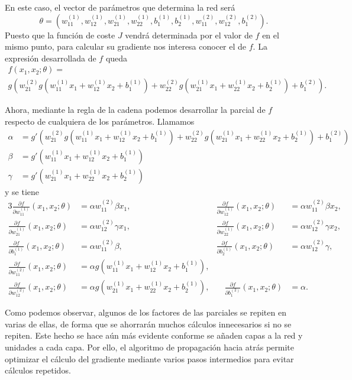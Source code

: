 \begin{example}
En este caso, el vector de parámetros que determina la red será
$$\theta=\left(w_{11}^{(1)},w_{12}^{(1)},w_{21}^{(1)},w_{22}^{(1)},b_{1}^{(1)},b_{2}^{(1)},w_{11}^{(2)},w_{12}^{(2)},b_{1}^{(2)}\right).$$
Puesto que la función de coste $J$ vendrá determinada por el valor de $f$ en el mismo punto, para calcular su gradiente nos interesa conocer el de $f$. La expresión desarrollada de $f$ queda
\begin{gather*}
f(x_1,x_2;\theta)=\\g\left(w_{21}^{(2)}g\left(w_{11}^{(1)}x_{1}+w_{12}^{(1)}x_2+b_1^{(1)}\right)+w_{22}^{(2)}g\left(w_{21}^{(1)}x_1+w_{22}^{(1)}x_2+b_2^{(1)}\right)+b_1^{(2)}\right).
\end{gather*}

Ahora, mediante la regla de la cadena podemos desarrollar la parcial de $f$ respecto de cualquiera de los parámetros. Llamamos
\footnotesize
\begin{align*}
  \alpha&=g'\left(w_{21}^{(2)} g\left(w_{11}^{(1)}x_{1}+w_{12}^{(1)}x_2+b_1^{(1)}\right) + w_{22}^{(2)} g\left(w_{21}^{(1)}x_1+w_{22}^{(1)}x_2+b_2^{(1)}\right)+b_1^{(2)}\right)\\
  \beta&=g'\left(w_{11}^{(1)}x_{1}+w_{12}^{(1)}x_2+b_1^{(1)}\right)\\
  \gamma&=g'\left(w_{21}^{(1)}x_{1}+w_{22}^{(1)}x_2+b_2^{(1)}\right)
\end{align*}
\normalsize
y se tiene
\footnotesize
\begin{alignat*}{3}
  \frac{\partial f}{\partial w_{11}^{(1)}}(x_1,x_2;\theta)&=\alpha w_{11}^{(2)}\beta x_1,\quad&
  \frac{\partial f}{\partial w_{12}^{(1)}}(x_1,x_2;\theta)&=\alpha w_{11}^{(2)}\beta x_2,\\
  \frac{\partial f}{\partial w_{21}^{(1)}}(x_1,x_2;\theta)&=\alpha w_{12}^{(2)}\gamma x_1,\quad&
  \frac{\partial f}{\partial w_{22}^{(1)}}(x_1,x_2;\theta)&=\alpha w_{12}^{(2)}\gamma x_2,\\
  \frac{\partial f}{\partial b_{1}^{(1)}}(x_1,x_2;\theta)&=\alpha w_{11}^{(2)}\beta, \quad&
  \frac{\partial f}{\partial b_{2}^{(1)}}(x_1,x_2;\theta)&=\alpha w_{12}^{(2)}\gamma, \\
  \frac{\partial f}{\partial w_{11}^{(2)}}(x_1,x_2;\theta)&=\alpha g(w_{11}^{(1)}x_{1}+w_{12}^{(1)}x_2 + b_1^{(1)}),&&\\
  \frac{\partial f}{\partial w_{12}^{(2)}}(x_1,x_2;\theta)&=\alpha g(w_{21}^{(1)}x_{1}+w_{22}^{(1)}x_2 + b_2^{(1)}),&\quad
  \frac{\partial f}{\partial b_{1}^{(2)}}(x_1,x_2;\theta)&=\alpha.
\end{alignat*}
\normalsize

Como podemos observar, algunos de los factores de las parciales se repiten en varias de ellas, de forma que se ahorrarán muchos cálculos innecesarios si no se repiten. Este hecho se hace aún más evidente conforme se añaden capas a la red y unidades a cada capa. Por ello, el algoritmo de propagación hacia atrás permite optimizar el cálculo del gradiente mediante varios pasos intermedios para evitar cálculos repetidos.

\end{example}

